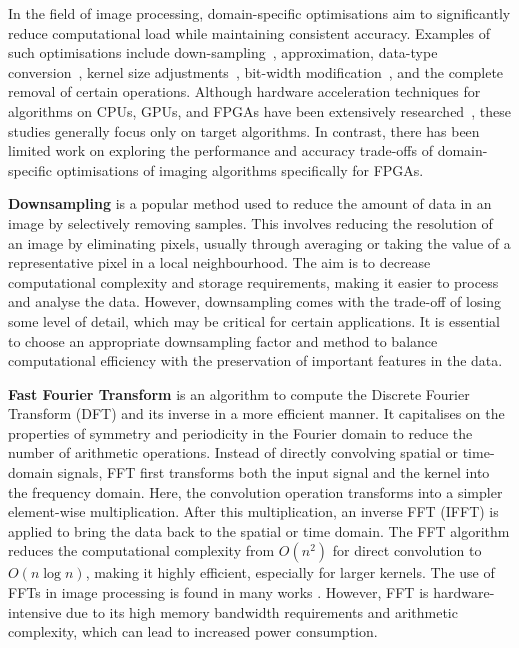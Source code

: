 In the field of image processing, domain-specific optimisations aim to significantly reduce computational load while maintaining consistent accuracy. Examples of such optimisations include down-sampling~\cite{LinDon06}, approximation\cite{SharZha16}, data-type conversion~\cite{YonLiGuo01}, kernel size adjustments~\cite{NikMaiLon17}, bit-width modification~\cite{WanLouQui18}, and the complete removal of certain operations. Although hardware acceleration techniques for algorithms on CPUs, GPUs, and FPGAs have been extensively researched~\cite{WanWenYan15,SteFraStu14,RisBlaWan13}, these studies generally focus only on target algorithms. In contrast, there has been limited work on exploring the performance and accuracy trade-offs of domain-specific optimisations of imaging algorithms specifically for FPGAs.


\textbf{Downsampling} is a popular method used to reduce the amount of data in an image by selectively removing samples. This involves reducing the resolution of an image by eliminating pixels, usually through averaging or taking the value of a representative pixel in a local neighbourhood. The aim is to decrease computational complexity and storage requirements, making it easier to process and analyse the data. However, downsampling comes with the trade-off of losing some level of detail, which may be critical for certain applications. It is essential to choose an appropriate downsampling factor and method to balance computational efficiency with the preservation of important features in the data.


\textbf{Fast Fourier Transform} is an algorithm to compute the Discrete Fourier Transform (DFT) and its inverse in a more efficient manner. It capitalises on the properties of symmetry and periodicity in the Fourier domain to reduce the number of arithmetic operations. Instead of directly convolving spatial or time-domain signals, FFT first transforms both the input signal and the kernel into the frequency domain. Here, the convolution operation transforms into a simpler element-wise multiplication. After this multiplication, an inverse FFT (IFFT) is applied to bring the data back to the spatial or time domain. The FFT algorithm reduces the computational complexity from \(O(n^2)\) for direct convolution to \(O(n \log n)\), making it highly efficient, especially for larger kernels. The use of FFTs in image processing is found in many works \cite{RioDuh92,FiaCad06,ZhaCheSon16}. However, FFT is hardware-intensive due to its high memory bandwidth requirements and arithmetic complexity, which can lead to increased power consumption.

